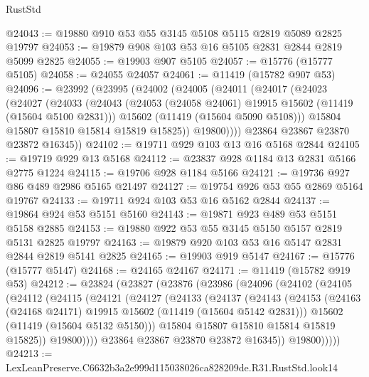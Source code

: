 \begin{lexlean}{RustStd}
\begin{coremodule}
@24043 := @19880 @910 @53 @55 @3145 @5108 @5115 @2819 @5089 @2825 @19797
@24053 := @19879 @908 @103 @53 @16 @5105 @2831 @2844 @2819 @5099 @2825
@24055 := @19903 @907 @5105
@24057 := @15776 (@15777 @5105)
@24058 := @24055 @24057
@24061 := @11419 (@15782 @907 @53)
@24096 := @23992
    (@23995
      (@24002
        (@24005
          (@24011
            (@24017
              (@24023
                (@24027
                  (@24033
                    (@24043
                      (@24053 (@24058 @24061) @19915 @15602 (@11419 (@15604 @5100 @2831)))
                      @15602
                      (@11419 (@15604 @5090 @5108)))
                    @15804
                    @15807
                    @15810
                    @15814
                    @15819
                    @15825))
                @19800))))
        @23864
        @23867
        @23870
        @23872
        @16345))
@24102 := @19711 @929 @103 @13 @16 @5168 @2844
@24105 := @19719 @929 @13 @5168
@24112 := @23837 @928 @1184 @13 @2831 @5166 @2775 @1224
@24115 := @19706 @928 @1184 @5166
@24121 := @19736 @927 @86 @489 @2986 @5165 @21497
@24127 := @19754 @926 @53 @55 @2869 @5164 @19767
@24133 := @19711 @924 @103 @53 @16 @5162 @2844
@24137 := @19864 @924 @53 @5151 @5160
@24143 := @19871 @923 @489 @53 @5151 @5158 @2885
@24153 := @19880 @922 @53 @55 @3145 @5150 @5157 @2819 @5131 @2825 @19797
@24163 := @19879 @920 @103 @53 @16 @5147 @2831 @2844 @2819 @5141 @2825
@24165 := @19903 @919 @5147
@24167 := @15776 (@15777 @5147)
@24168 := @24165 @24167
@24171 := @11419 (@15782 @919 @53)
@24212 := @23824
    (@23827
      (@23876
        (@23986
          (@24096
            (@24102
              (@24105
                (@24112
                  (@24115
                    (@24121
                      (@24127
                        (@24133
                          (@24137
                            (@24143
                              (@24153
                                (@24163 (@24168 @24171) @19915 @15602 (@11419 (@15604 @5142 @2831)))
                                @15602
                                (@11419 (@15604 @5132 @5150)))
                              @15804
                              @15807
                              @15810
                              @15814
                              @15819
                              @15825))
                          @19800))))
                  @23864
                  @23867
                  @23870
                  @23872
                  @16345))
              @19800)))))
@24213 := LexLeanPreserve.C6632b3a2e999d115038026ca828209de.R31.RustStd.look14

\end{coremodule}
\end{lexlean}

